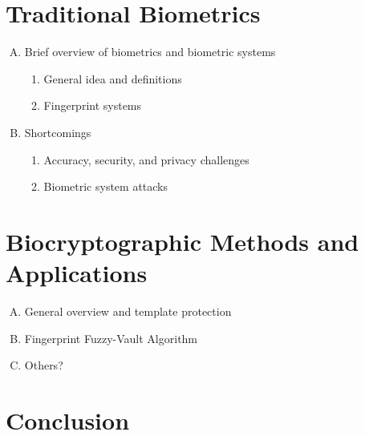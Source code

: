 \documentclass[11pt]{article}
\begin{document}
\section{Traditional Biometrics}
     \begin{enumerate}[A.]
    \item Brief overview of biometrics and biometric systems 
        \begin{enumerate}[1.]
        \item General idea and definitions
        \item Fingerprint systems
        \end{enumerate}
    \item Shortcomings 
        \begin{enumerate}[1.]
        \item Accuracy, security, and privacy challenges
        \item Biometric system attacks
        \end{enumerate}
    \end{enumerate}
\section{Biocryptographic Methods and Applications}
    \begin{enumerate}[A.]
    \item General overview and template protection
    \item Fingerprint Fuzzy-Vault Algorithm
    \item Others?
    \end{enumerate}
\section{Conclusion}

\singlespace
\nocite{*}
{}

\end{document}
